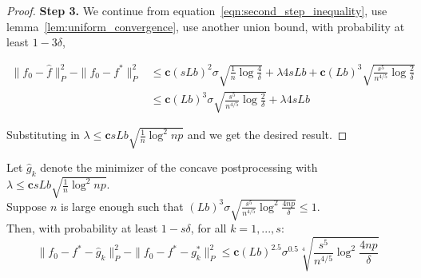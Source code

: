 \begin{proof}

\textbf{Step 3.} We continue from equation~\ref{eqn:second_step_inequality}, use lemma~\ref{lem:uniform_convergence}, use another union bound, with probability at least $1-3\delta$,

\begin{align}
\|f_0 - \hat{f} \|_P^2 - \| f_0 - f^* \|_P^2 
   &\leq \mathbf{c} (sLb)^2 \sigma \sqrt{\frac{1}{n} \log \frac{4}{\delta}} 
 +\lambda 4 s L b + \mathbf{c} (Lb)^3 \sqrt{ \frac{s^5}{n^{4/5}} \log \frac{2}{\delta}}
    \nonumber \\
&\leq \mathbf{c} (Lb)^3 \sigma \sqrt{ \frac{s^5}{n^{4/5}} \log \frac{2}{\delta}} + \lambda 4 sLb
\end{align}

Substituting in $\lambda \leq \mathbf{c} sLb \sqrt{\frac{1}{n} \log^2 np}$ and we get the desired result.

\end{proof}
 






\begin{theorem}
\label{thm:concave_consistent}
Let $\hat{g}_k$ denote the minimizer of the concave postprocessing with $\lambda \leq \mathbf{c} sLb \sqrt{\frac{1}{n} \log^2 np}$.\\

Suppose $n$ is large enough such that $(Lb)^3 \sigma \sqrt{ \frac{s^5}{n^{4/5}} \log^2 \frac{4np}{\delta} } \leq 1$.\\

Then, with probability at least $1- s\delta$, for all $k=1,...,s$:\\
\[
\| f_0 - f^* - \hat{g}_k \|_P^2 - \| f_0 - f^* - g^*_k \|_P^2 \leq  \mathbf{c}(Lb)^{2.5} \sigma^{0.5} \sqrt[4]{ \frac{s^5}{n^{4/5}} \log^2 \frac{4np}{\delta}} 
\]
\end{theorem}

